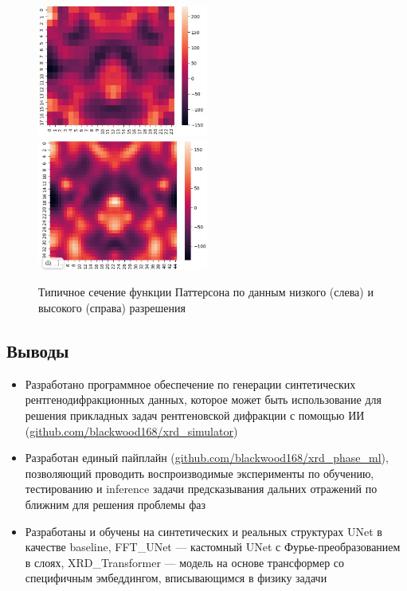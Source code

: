 \documentclass[a4paper,12pt]{article}
\begin{document}
{\begin{figure}[H]
    \centering
    \includegraphics[width=0.5\textwidth]{patt_high.png}\hfill
    \includegraphics[width=0.5\textwidth]{patt_low.png}
    \caption{Типичное сечение функции Паттерсона по данным низкого (слева) и высокого (справа) разрешения}
    \label{patt}
\end{figure}

\subsection*{Выводы}

\begin{itemize}
\item Разработано программное обеспечение по генерации синтетических рентгенодифракционных данных, которое может быть использование для решения прикладных задач рентгеновской дифракции с помощью ИИ (\url{github.com/blackwood168/xrd_simulator})

\item Разработан единый пайплайн (\url{github.com/blackwood168/xrd_phase_ml}), позволяющий проводить воспроизводимые эксперименты по обучению, тестированию и inference задачи предсказывания дальних отражений по ближним для решения проблемы фаз

\item Разработаны и обучены на синтетических и реальных структурах UNet в качестве baseline, FFT\_UNet --- кастомный UNet с Фурье-преобразованием в слоях, XRD\_Transformer --- модель на основе трансформер со специфичным эмбеддингом, вписывающимся в физику задачи


\end{itemize}}
\end{document}
